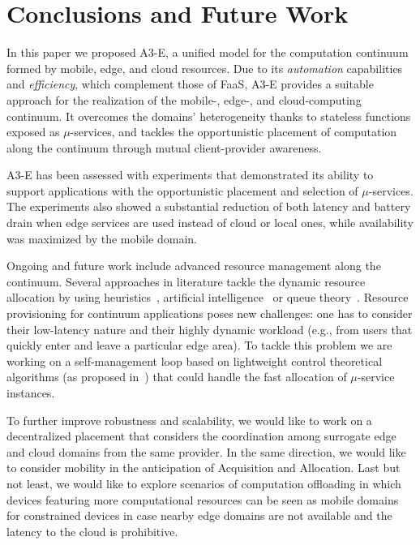\section{Conclusions and Future Work}\label{sec:conclusions}

In this paper we proposed A3-E, a unified model for the computation continuum formed by mobile, edge, and cloud resources. Due to its \textit{automation} capabilities and \textit{efficiency}, which complement those of FaaS, A3-E provides a suitable approach for the realization of the mobile-, edge-, and cloud-computing continuum. It overcomes the domains' heterogeneity thanks to stateless functions exposed as $\mu$-services, and tackles the opportunistic placement of computation along the continuum through mutual client-provider awareness. %

A3-E has been assessed with experiments that demonstrated its ability to support applications with the opportunistic placement and selection of $\mu$-services. 
The experiments also showed a substantial reduction of both latency and battery drain when edge services are used instead of cloud or local ones, while availability was maximized by the mobile domain. 


Ongoing and future work include advanced resource management along the continuum. Several approaches in literature tackle the dynamic resource allocation by using heuristics~\cite{dustdar0}, artificial intelligence~\cite{ia1} or queue theory~\cite{queue1}. 
Resource provisioning for continuum applications poses new challenges: one has to consider their low-latency nature and their highly dynamic workload (e.g., from users that quickly enter and leave a particular edge area). To tackle this problem we are working on a self-management loop based on lightweight control theoretical algorithms (as proposed in~\cite{Quatrocchi2016discrete}) that could handle the fast allocation of $\mu$-service instances. %


To further improve robustness and scalability, we would like to work on a decentralized placement that considers the coordination among surrogate edge and cloud domains from the same provider. In the same direction, we would like to consider mobility in the anticipation of Acquisition and Allocation. Last but not least, 
we would like to explore scenarios of computation offloading in which devices featuring more computational resources can be seen as mobile domains for constrained devices in case nearby edge domains are not available and the latency to the cloud is prohibitive.